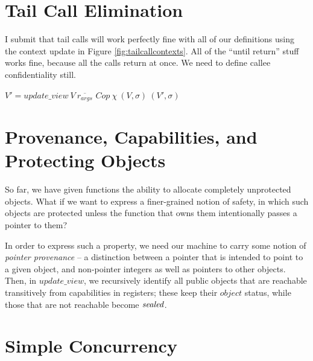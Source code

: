 \documentclass[10pt,conference]{ieeetran}%
\theoremstyle{definition}
\begin{document}
\section{Tail Call Elimination}

I submit that tail calls will work perfectly fine with all of our definitions
using the context update in Figure \ref{fig:tailcallcontexts}. All of the
``until return'' stuff works fine, because all the calls return at once.
We need to define callee confidentiality still.

\begin{figure*}

            {\(V' = \mathit{update\_view} ~ V ~ \overline{r_{args}}\)}
            {\(Cop ~ \chi ~ (V,\sigma) ~ (V',\sigma)\)}

\caption{Tailcall context updates}
\label{fig:tailcallcontexts}
\end{figure*}

\section{Provenance, Capabilities, and Protecting Objects}

So far, we have given functions the ability to allocate completely unprotected
objects. What if we want to express a finer-grained notion of safety, in which
such objects are protected unless the function that owns them intentionally
passes a pointer to them?

In order to express such a property, we need our machine to carry some notion
of {\it pointer provenance} -- a distinction between a pointer that is intended to
point to a given object, and non-pointer integers as well as pointers to other objects.
Then, in \(\mathit{update\_view}\), we recursively identify all public objects that
are reachable transitively from capabilities in registers; these keep their
\(\mathit{object}\) status, while those that are not reachable become \(\mathit{sealed}\).

\section{Simple Concurrency}



\end{document}
